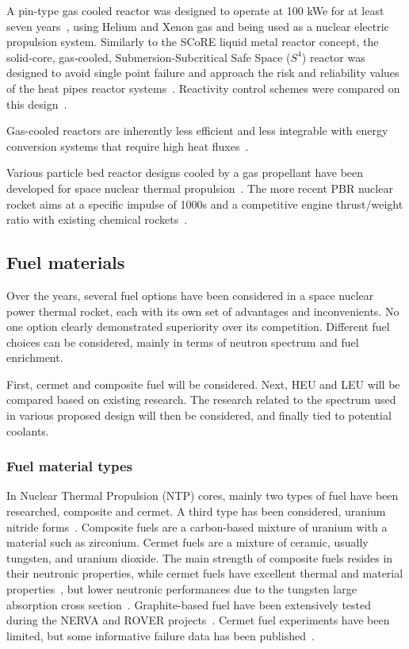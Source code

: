 \documentclass{article}
\begin{document}
A pin-type gas cooled reactor was designed to operate at 100 kWe for at least seven years~\cite{wright2003pin}, using Helium and Xenon gas and being used as a nuclear electric propulsion system. Similarly to the SCoRE liquid metal reactor concept, the solid‐core, gas‐cooled, Submersion‐Subcritical Safe Space ($S^4$) reactor was designed to avoid single point failure and approach the risk and reliability values of the heat pipes reactor systems~\cite{king2006solid,king2009thermal}. Reactivity control schemes were compared on this design~\cite{craft2011reactivity}.

Gas-cooled reactors are inherently less efficient and less integrable with energy conversion systems that require high heat fluxes~\cite{el2002performance,fraas1966comparison,dochat1992free}.

Various particle bed reactor designs cooled by a gas propellant have been developed for space nuclear thermal propulsion~\cite{hatch1960fluidized,ludewig1974feasibility,powell1985high}. The more recent PBR nuclear rocket aims at a specific impulse of 1000s and a competitive engine thrust/weight ratio with existing chemical rockets~\cite{ludewig1996design}.


\subsection{Fuel materials}
\label{fuelmat}

Over the years, several fuel options have been considered in a space nuclear power thermal rocket, each with its own set of advantages and inconvenients. No one option clearly demonstrated superiority over its competition. Different fuel choices can be considered, mainly in terms of neutron spectrum and fuel enrichment.

First, cermet and composite fuel will be considered. Next, HEU and LEU will be compared based on existing research. The research related to the spectrum used in various proposed design will then be considered, and finally tied to potential coolants.

\subsubsection{Fuel material types}

In Nuclear Thermal Propulsion (NTP) cores, mainly two types of fuel have been researched, composite and cermet. A third type has been considered, uranium nitride forms~\cite{matthews1993fuels}. Composite fuels are a carbon-based mixture of uranium with a material such as zirconium. Cermet fuels are a mixture of ceramic, usually tungsten, and uranium dioxide. The main strength of composite fuels resides in their neutronic properties, while cermet fuels have excellent thermal and material properties~\cite{postoncermet}, but lower neutronic performances due to the tungsten large absorption cross section~\cite{venneridesign}. Graphite-based fuel have been extensively tested during the NERVA and ROVER projects~\cite{taub1975review,lyon1973performance}. Cermet fuel experiments have been limited, but some informative failure data has been published~\cite{stewart2013comparison}.
\end{document}
